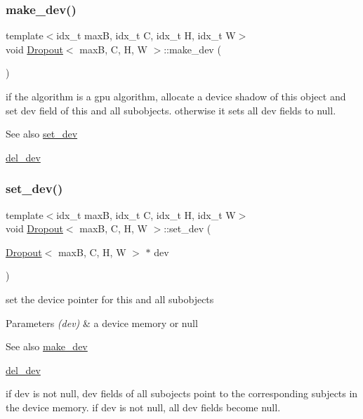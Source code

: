 \subsubsection{\texorpdfstring{make\+\_\+dev()}{make\_dev()}}
{\footnotesize\ttfamily template$<$idx\+\_\+t maxB, idx\+\_\+t C, idx\+\_\+t H, idx\+\_\+t W$>$ \\
void \hyperlink{structDropout}{Dropout}$<$ maxB, C, H, W $>$\+::make\+\_\+dev (\begin{DoxyParamCaption}{ }\end{DoxyParamCaption})\hspace{0.3cm}{\ttfamily [inline]}}



if the algorithm is a gpu algorithm, allocate a device shadow of this object and set dev field of this and all subobjects. otherwise it sets all dev fields to null. 

\begin{DoxySeeAlso}{See also}
\hyperlink{structDropout_aacd2c2da4fb3bd6718b2b43bc26538b9}{set\+\_\+dev} 

\hyperlink{structDropout_a34adb045be5a2a9546ff99fec3ba1f30}{del\+\_\+dev} 
\end{DoxySeeAlso}
\mbox{\label{structDropout_aacd2c2da4fb3bd6718b2b43bc26538b9}} 
\subsubsection{\texorpdfstring{set\+\_\+dev()}{set\_dev()}}
{\footnotesize\ttfamily template$<$idx\+\_\+t maxB, idx\+\_\+t C, idx\+\_\+t H, idx\+\_\+t W$>$ \\
void \hyperlink{structDropout}{Dropout}$<$ maxB, C, H, W $>$\+::set\+\_\+dev (\begin{DoxyParamCaption}\item[{\hyperlink{structDropout}{Dropout}$<$ maxB, C, H, W $>$ $\ast$}]{dev }\end{DoxyParamCaption})\hspace{0.3cm}{\ttfamily [inline]}}



set the device pointer for this and all subobjects 


\begin{DoxyParams}{Parameters}
{\em (dev)} & a device memory or null \\
\hline
\end{DoxyParams}
\begin{DoxySeeAlso}{See also}
\hyperlink{structDropout_ad1ea86b3d3240a95c9b8c52756ef23a9}{make\+\_\+dev} 

\hyperlink{structDropout_a34adb045be5a2a9546ff99fec3ba1f30}{del\+\_\+dev}
\end{DoxySeeAlso}
if dev is not null, dev fields of all subojects point to the corresponding subjects in the device memory. if dev is not null, all dev fields become null. 

